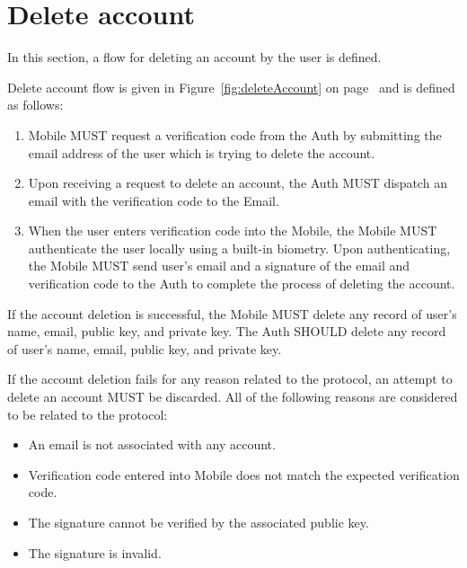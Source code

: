 \section{Delete account}
In this section, a flow for deleting an account by the user is defined. 
\medskip

Delete account flow is given in Figure~\ref{fig:deleteAccount} on page~\pageref{fig:deleteAccount} and is defined 
as follows:
    \begin{enumerate}
        \item Mobile MUST request a verification code from the Auth by submitting the email address of the user
                which is trying to delete the account.
        \item Upon receiving a request to delete an account, the Auth MUST dispatch an email with the verification
                code to the Email.
        \item When the user enters verification code into the Mobile, the Mobile MUST authenticate the user locally 
                using a built-in biometry. Upon authenticating, the Mobile MUST send user's email and a signature 
                of the email and verification code to the Auth to complete the process of deleting the account.
    \end{enumerate}
    
If the account deletion is successful, the Mobile MUST delete any record of user's name, email, public key, and 
private key. The Auth SHOULD delete any record of user's name, email, public key, and private key.
\medskip

If the account deletion fails for any reason related to the protocol, an attempt to delete an account MUST be 
discarded. All of the following reasons are considered to be related to the protocol:
    \begin{itemize}
        \item An email is not associated with any account.
        \item Verification code entered into Mobile does not match the expected verification code.
        \item The signature cannot be verified by the associated public key.
        \item The signature is invalid.
    \end{itemize}
